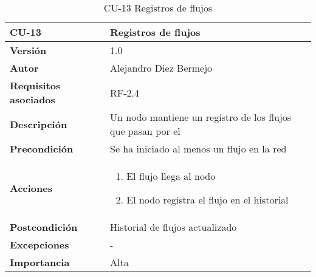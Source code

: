 \begin{table}[p]
	\centering
	\begin{tabularx}{\linewidth}{ p{} p{} }
		\toprule
		\textbf{CU-13}    & \textbf{Registros de flujos}\\
		\toprule
		\textbf{Versión}              & 1.0    \\
		\textbf{Autor}                & Alejandro Diez Bermejo \\
		\textbf{Requisitos asociados} & RF-2.4 \\
		\textbf{Descripción}          & Un nodo mantiene un registro de los flujos que pasan por el \\
        \textbf{Precondición}         & Se ha iniciado al menos un flujo en la red \\
		\textbf{Acciones}             &
		\begin{enumerate}
			\def\labelenumi{\arabic{enumi}.}
			\tightlist
            \item El flujo llega al nodo
            \item El nodo registra el flujo en el historial
		\end{enumerate}\\
		\textbf{Postcondición}        & Historial de flujos actualizado \\
		\textbf{Excepciones}          & - \\
		\textbf{Importancia}          & Alta \\
		\bottomrule
	\end{tabularx}
	\caption{CU-13 Registros de flujos}
\end{table}

